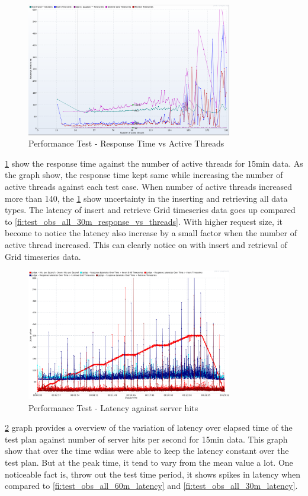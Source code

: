 \begin{figure}[htp]
    \centering
    \includegraphics[width=0.8\textwidth]{results/obs/all/obs_all_15m_response_times_vs_threads.png}
    \caption{Performance Test - Response Time vs Active Threads}
    \label{fi:test_obs_all_15m_response_vs_threads}
\end{figure}
\ref{fi:test_obs_all_15m_response_vs_threads} show the response time against the number of active threads for 15min data. As the graph show, the response time kept same while increasing the number of active threads against each test case. When number of active threads increased more than 140, the \ref{fi:test_obs_all_15m_response_vs_threads} show uncertainty in the inserting and retrieving all data types. The latency of insert and retrieve Grid timeseries data goes up compared to \ref{fi:test_obs_all_30m_response_vs_threads}.
With higher request size, it become to notice the latency also increase by a small factor when the number of active thread increased. This can clearly notice on with insert and retrieval of Grid timeseries data.

\begin{figure}[htp]
    \centering
    \includegraphics[width=0.8\textwidth]{results/obs/all/obs_all_15m_res_latencies_against_hits.png}
    \caption{Performance Test - Latency against server hits}
    \label{fi:test_obs_all_15m_latency}
\end{figure}
\ref{fi:test_obs_all_15m_latency} graph provides a overview of the variation of latency over elapsed time of the test plan against number of server hits per second for 15min data.
This graph show that over the time \acrshort{wdias} were able to keep the latency constant over the test plan. But at the peak time, it tend to vary from the mean value a lot.
One noticeable fact is, throw out the test time period, it shows spikes in latency when compared to \ref{fi:test_obs_all_60m_latency} and \ref{fi:test_obs_all_30m_latency}.

